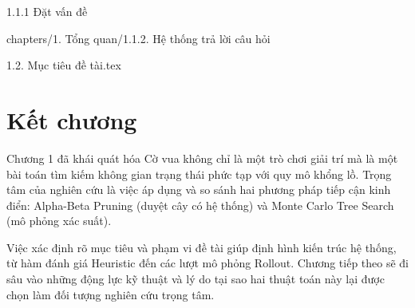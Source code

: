 {1.1.1 Đặt vấn đề}

{chapters/1. Tổng quan/1.1.2. Hệ thống trả lời câu hỏi}

{1.2. Mục tiêu đề tài.tex}



\section{Kết chương}

Chương 1 đã khái quát hóa Cờ vua không chỉ là một trò chơi giải trí mà là một bài toán tìm kiếm không gian trạng thái phức tạp với quy mô khổng lồ. Trọng tâm của nghiên cứu là việc áp dụng và so sánh hai phương pháp tiếp cận kinh điển: Alpha-Beta Pruning (duyệt cây có hệ thống) và Monte Carlo Tree Search (mô phỏng xác suất).

Việc xác định rõ mục tiêu và phạm vi đề tài giúp định hình kiến trúc hệ thống, từ hàm đánh giá Heuristic đến các lượt mô phỏng Rollout. Chương tiếp theo sẽ đi sâu vào những động lực kỹ thuật và lý do tại sao hai thuật toán này lại được chọn làm đối tượng nghiên cứu trọng tâm.



